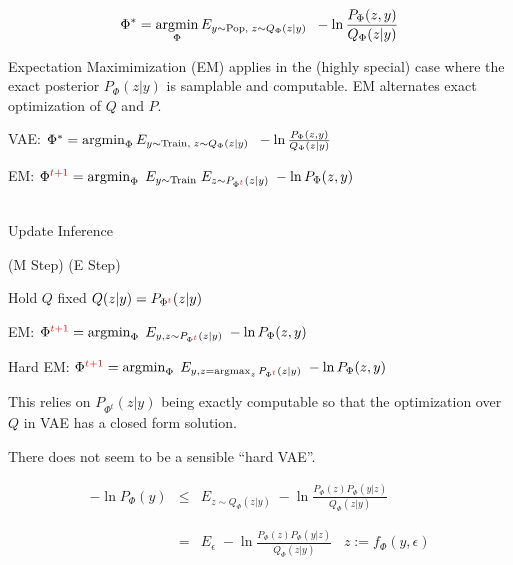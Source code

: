 {

$$\Phi^* = \operatorname*{argmin}_\Phi E_{y\sim \mathrm{Pop},\;z \sim Q_\Phi(z|y)}\;\;-\ln \frac{P_\Phi(z,y)}{Q_\Phi(z|y)}$$


Expectation Maximimization (EM) applies in the (highly special) case where the exact posterior $P_\Phi(z|y)$ is samplable and computable.
EM alternates exact optimization of $Q$ and $P$.

\vfill
VAE: $\Phi^* = \operatorname*{argmin}_\Phi E_{y\sim \mathrm{Train},\;z \sim Q_\Phi(z|y)}\;\;- \ln \frac{P_\Phi(z,y)}{Q_\Phi(z|y)}$

\vfill
EM: $\Phi^{\color{red} t+1} =  \operatorname*{argmin}_\Phi\;E_{y \sim \mathrm{Train}}\;E_{z \sim P_{\Phi^{\color{red} t}}(z|y)}\; - \ln P_\Phi(z,y)$ \\
\\
\centerline{\hspace{1em} Update \hspace{6em} Inference \hspace{2.5em}~}
\centerline{(M Step) \hspace{5em} (E Step) \hspace{1.5em}~}
\centerline{Hold $Q$ fixed \hspace{2.5em} $Q(z|y) = P_{\Phi^{\color{red} t}}(z|y)$ \hspace{0em}~}


EM: $\Phi^{\color{red} t+1} =  \operatorname*{argmin}_\Phi\;E_{y,z \sim P_{\Phi^{\color{red} t}}(z|y)}\; - \ln P_\Phi(z,y)$

\vfill
Hard EM: $\Phi^{\color{red} t+1} =  \operatorname*{argmin}_\Phi\; E_{y, z = \operatorname*{argmax}_z P_{\Phi^{\color{red} t}}(z|y)} \;- \ln P_\Phi(z,y)$

\vfill
This relies on $P_{\Phi^t}(z|y)$ being exactly computable so that the optimization over $Q$ in VAE has a closed form solution.

\vfill
There does not seem to be a sensible ``hard VAE''.


\begin{eqnarray*}
- \ln P_\Phi(y) & \leq & E_{z \sim Q_\Phi(z|y)}\;-\ln \frac{P_\Phi(z)P_\Phi(y|z)}{Q_\Phi(z|y)} \\
\\
\\
& = & E_\epsilon\;-\ln \frac{P_\Phi(z)P_\Phi(y|z)}{Q_\Phi(z|y)}\;\;\;z := f_\Phi(y,\epsilon)
\end{eqnarray*}

}
